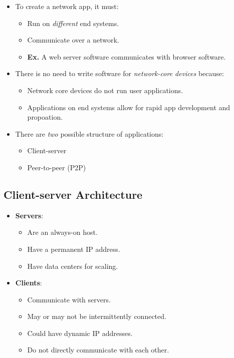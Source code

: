 \documentclass{article}
\begin{document}
\begin{itemize}
\item To create a network app, it must:
\begin{itemize}
\item Run on {\it different} end systems.
\item Communicate over a network.
\item {\bf Ex.} A web server software communicates with browser software.
\end{itemize}
\item There is no need to write software for {\it network-core devices} because:
\begin{itemize}
\item Network core devices do not run user applications.
\item Applications on end systems allow for rapid app development and propoation.
\end{itemize}
\item There are {\it two} possible structure of applications:
\begin{itemize}
\item Client-server
\item Peer-to-peer (P2P)
\end{itemize}
\end{itemize}

\subsection{Client-server Architecture}

\begin{itemize}
\item {\bf Servers}:
\begin{itemize}
\item Are an always-on host.
\item Have a permanent IP address.
\item Have data centers for scaling.
\end{itemize}
\item {\bf Clients}:
\begin{itemize}
\item Communicate with servers.
\item May or may not be intermittently connected.
\item Could have dynamic IP addresses.
\item Do not directly communicate with each other.
\end{itemize}
\end{itemize}
\end{document}
